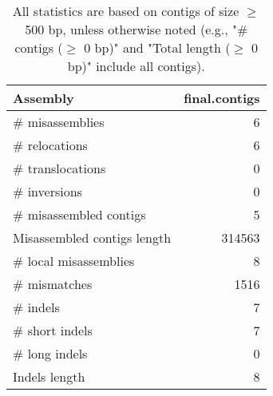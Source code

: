 \documentclass[12pt,a4paper]{article}
\begin{document}
\begin{table}[ht]
\begin{center}
\caption{All statistics are based on contigs of size $\geq$ 500 bp, unless otherwise noted (e.g., "\# contigs ($\geq$ 0 bp)" and "Total length ($\geq$ 0 bp)" include all contigs).}
\begin{tabular}{|l*{1}{|r}|}
\hline
Assembly & final.contigs \\ \hline
\# misassemblies & 6 \\ \hline
\hspace{5mm}\# relocations & 6 \\ \hline
\hspace{5mm}\# translocations & 0 \\ \hline
\hspace{5mm}\# inversions & 0 \\ \hline
\# misassembled contigs & 5 \\ \hline
Misassembled contigs length & 314563 \\ \hline
\# local misassemblies & 8 \\ \hline
\# mismatches & 1516 \\ \hline
\# indels & 7 \\ \hline
\hspace{5mm}\# short indels & 7 \\ \hline
\hspace{5mm}\# long indels & 0 \\ \hline
Indels length & 8 \\ \hline
\end{tabular}
\end{center}
\end{table}
\end{document}
